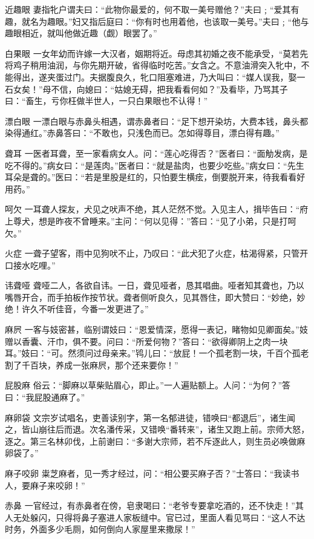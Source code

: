 \documentclass[12pt,UTF8]{ctexbook}
\begin{document}
近趣眼
妻指牝户谓夫曰：“此物你最爱的，何不取一美号赠他？”夫曰﹔“爱其有趣，就名为趣眼。”妇又指后庭曰：“你有时也用着他，也该取一美号。”夫曰﹔“他与趣眼相近，就叫他做近趣（觑）眼罢了。”

白果眼
一女年幼而许嫁一大汉者，姻期将近。母虑其初婚之夜不能承受，“莫若先将鸡子稍用油润，与你先期开破，省得临时吃苦。”女含之。不意油滑突入牝中，不能得出，遂夹蛋过门。夫据腹良久，牝口阻塞难进，乃大叫曰：“媒人误我，娶一石女矣！”母不信，向媳曰：“姑媳无碍，把我看看何如？”及看毕，乃骂其子曰：“畜生，亏你枉做半世人，一只白果眼也不认得！”

漂白眼
一漂白眼与赤鼻头相遇，谓赤鼻者曰：“足下想开染坊，大费本钱，鼻头都染得通红。”赤鼻答曰：“不敢也，只浅色而已。怎如得尊目，漂白得有趣。”

聋耳
一医者耳聋，至一家看病女人。问：“莲心吃得否？”医者曰：“面觔发病，是吃不得的。”病女曰：“是莲肉。”医者曰：“就是盐肉，也要少吃些。”病女曰：“先生耳朵是聋的。”医曰：“若是里股是红的，只怕要生横痃，倒要脱开来，待我看看好用药。”

呵欠
一耳聋人探友，犬见之吠声不绝，其人茫然不觉。入见主人，揖毕告曰：“府上尊犬，想是昨夜不曾睡来。”主问：“何以见得：”答曰：“见了小弟，只是打呵欠。”

火症
一聋子望客，雨中见狗吠不止，乃叹曰：“此犬犯了火症，枯渴得紧，只管开口接水吃哩。”

讳聋哑
聋哑二人，各欲自讳。一日，聋见哑者，恳其唱曲。哑者知其聋也，乃以嘴唇开合，而手拍板作按节状。聋者侧听良久，见其唇住，即大赞曰：“妙绝，妙绝！许久不听佳音，今番一发更进了。”

麻屄
一客与妓密甚，临别谓妓曰：“恩爱情深，愿得一表记，睹物如见卿面矣。”妓赠以香囊、汗巾，俱不要。问曰：“所爱何物？”答曰：“欲得卿阴上之肉一块耳。”妓曰：“可。然须问过母亲来。”鸨儿曰：“放屁！一个孤老割一块，千百个孤老割了千百块，养成一张麻屄，那个还来要你！”

屁股麻
俗云：“脚麻以草柴贴眉心，即止。”一人遍贴额上。人问：“为何？”答曰：“我屁股通麻了。”

麻卵袋
文宗岁试唱名，吏善读别字，第一名郁进徒，错唤曰“都退后”，诸生闻之，皆山崩往后而退。次名潘传采，又错唤“番转来”，诸生又跑上前。宗师大怒，逐之。第三名林卯伐，上前谢曰：“多谢大宗师，若不斥逐此人，则生员必唤做麻卵袋了。”

麻子咬卵
粜芝麻者，见一秀才经过，问：“相公要买麻子否？”士答曰：“我读书人，要麻子来咬卵！”

赤鼻
一官经过，有赤鼻者在傍，皂隶喝曰：“老爷专要拿吃酒的，还不快走！”其人无处躲闪，只得将鼻子塞进人家板缝中。官已过，里面人看见骂曰：“这人不达时务，外面多少毛厕，如何倒向人家屋里来撒尿！”
\end{document}
